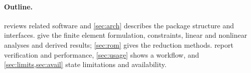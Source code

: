 \paragraph{Outline.}
 reviews related software and \cref{sec:arch} describes the package structure and interfaces.  give the finite element formulation, constraints, linear and nonlinear analyses and derived results;
\cref{sec:rom} gives the reduction methods.  report verification and performance, \cref{sec:usage} shows a workflow, and \cref{sec:limits,sec:avail} state limitations and availability.
